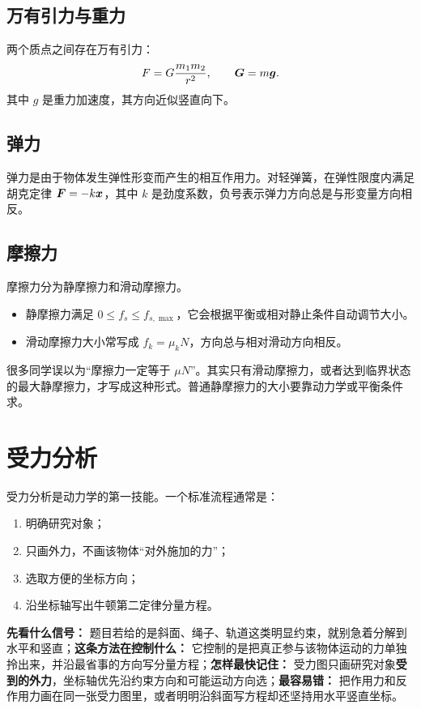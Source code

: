 \documentclass[lang=cn,11pt]{elegantbook}
\begin{document}
\subsection{万有引力与重力}

两个质点之间存在万有引力：
\[
F=G\frac{m_1m_2}{r^2},\qquad
\vb*{G}=m\vb*{g}.
\]
其中 \(g\) 是重力加速度，其方向近似竖直向下。

\subsection{弹力}

弹力是由于物体发生弹性形变而产生的相互作用力。对轻弹簧，在弹性限度内满足胡克定律 \(\vb*{F}=-k\vb*{x}\)，其中 \(k\) 是劲度系数，负号表示弹力方向总是与形变量方向相反。

\subsection{摩擦力}

摩擦力分为静摩擦力和滑动摩擦力。

\begin{itemize}
  \item 静摩擦力满足 \(0\le f_s\le f_{s,\max}\)，它会根据平衡或相对静止条件自动调节大小。
  \item 滑动摩擦力大小常写成 \(f_k=\mu_k N\)，方向总与相对滑动方向相反。
\end{itemize}

\begin{remark}
很多同学误以为“摩擦力一定等于 \(\mu N\)”。其实只有滑动摩擦力，或者达到临界状态的最大静摩擦力，才写成这种形式。普通静摩擦力的大小要靠动力学或平衡条件求。
\end{remark}

\section{受力分析}

受力分析是动力学的第一技能。一个标准流程通常是：
\begin{enumerate}
  \item 明确研究对象；
  \item 只画外力，不画该物体“对外施加的力”；
  \item 选取方便的坐标方向；
  \item 沿坐标轴写出牛顿第二定律分量方程。
\end{enumerate}

\begin{note}
\textbf{先看什么信号：} 题目若给的是斜面、绳子、轨道这类明显约束，就别急着分解到水平和竖直；\textbf{这条方法在控制什么：} 它控制的是把真正参与该物体运动的力单独拎出来，并沿最省事的方向写分量方程；\textbf{怎样最快记住：} 受力图只画研究对象\textbf{受到的外力}，坐标轴优先沿约束方向和可能运动方向选；\textbf{最容易错：} 把作用力和反作用力画在同一张受力图里，或者明明沿斜面写方程却还坚持用水平竖直坐标。
\end{note}
\end{document}
